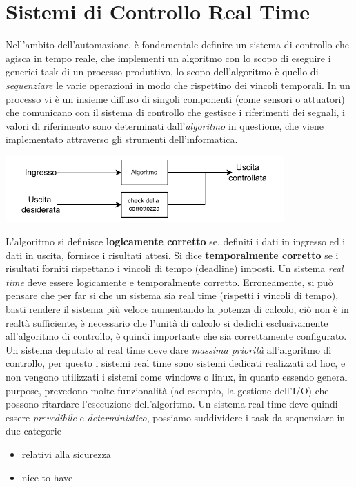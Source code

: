 \documentclass[10pt, letterpaper]{report}
\begin{document}
\chapter{Sistemi di Controllo Real Time}
Nell'ambito dell'automazione, è fondamentale definire un sistema di controllo che agisca in tempo reale, che 
implementi un algoritmo con lo scopo di eseguire i generici task di un processo produttivo, lo scopo dell'algoritmo 
è quello di \textit{sequenziare} le varie operazioni in modo che rispettino dei vincoli temporali.\acc 
In un processo vi è un insieme diffuso di singoli componenti (come sensori o attuatori) che comunicano con il 
sistema di controllo che gestisce i riferimenti dei segnali, i valori di riferimento sono determinati 
dall'\textit{algoritmo} in questione, che viene implementato attraverso gli strumenti dell'informatica.\begin{center}
    \includegraphics[width=0.8\textwidth ]{images/algoritmoControllo.pdf}
\end{center}
L'algoritmo si definisce \textbf{logicamente corretto} se, definiti i dati in ingresso ed i dati in uscita, fornisce i 
risultati attesi. Si dice \textbf{temporalmente corretto} se i risultati forniti rispettano i vincoli di tempo (deadline) 
imposti. Un sistema \textit{real time} deve essere logicamente e temporalmente corretto.\acc 
Erroneamente, si può pensare che per far si che un sistema sia real time (rispetti i vincoli di tempo), basti 
rendere il sistema più veloce aumentando la potenza di calcolo, ciò non è in realtà sufficiente, è necessario 
che l'unità di calcolo si dedichi esclusivamente all'algoritmo di controllo, è quindi importante che sia 
correttamente configurato. \acc 
Un sistema deputato al real time deve dare \textit{massima priorità} all'algoritmo di controllo, per questo i 
sistemi real time sono sistemi dedicati realizzati ad hoc, e non vengono utilizzati i sistemi come 
windows o linux, in quanto essendo general purpose, prevedono molte funzionalità (ad esempio, la gestione dell'I/O) che 
possono ritardare l'esecuzione dell'algoritmo.\acc 
Un sistema real time deve quindi essere \textit{prevedibile} e \textit{deterministico}, possiamo suddividere 
i task da sequenziare in due categorie \begin{itemize}
    \item relativi alla sicurezza 
    \item nice to have
\end{itemize}
\end{document}
